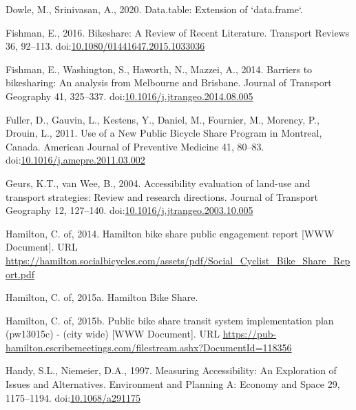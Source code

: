 \documentclass[]{elsarticle} %
\begin{document}
\leavevmode\hypertarget{ref-R-data.table}{}%
Dowle, M., Srinivasan, A., 2020. Data.table: Extension of `data.frame`.

\leavevmode\hypertarget{ref-fishmanBikeshareReviewRecent2016}{}%
Fishman, E., 2016. Bikeshare: A Review of Recent Literature. Transport
Reviews 36, 92--113.
doi:\href{https://doi.org/10.1080/01441647.2015.1033036}{10.1080/01441647.2015.1033036}

\leavevmode\hypertarget{ref-fishmanBarriersBikesharingAnalysis2014}{}%
Fishman, E., Washington, S., Haworth, N., Mazzei, A., 2014. Barriers to
bikesharing: An analysis from Melbourne and Brisbane. Journal of
Transport Geography 41, 325--337.
doi:\href{https://doi.org/10.1016/j.jtrangeo.2014.08.005}{10.1016/j.jtrangeo.2014.08.005}

\leavevmode\hypertarget{ref-fullerUseNewPublic2011}{}%
Fuller, D., Gauvin, L., Kestens, Y., Daniel, M., Fournier, M., Morency,
P., Drouin, L., 2011. Use of a New Public Bicycle Share Program in
Montreal, Canada. American Journal of Preventive Medicine 41, 80--83.
doi:\href{https://doi.org/10.1016/j.amepre.2011.03.002}{10.1016/j.amepre.2011.03.002}

\leavevmode\hypertarget{ref-geursAccessibilityEvaluationLanduse2004}{}%
Geurs, K.T., van Wee, B., 2004. Accessibility evaluation of land-use and
transport strategies: Review and research directions. Journal of
Transport Geography 12, 127--140.
doi:\href{https://doi.org/10.1016/j.jtrangeo.2003.10.005}{10.1016/j.jtrangeo.2003.10.005}

\leavevmode\hypertarget{ref-hamiltonsobi2014}{}%
Hamilton, C. of, 2014. Hamilton bike share public engagement report
{[}WWW Document{]}. URL
\url{https://hamilton.socialbicycles.com/assets/pdf/Social_Cyclist_Bike_Share_Report.pdf}

\leavevmode\hypertarget{ref-hamiltonHamiltonBikeShare2015}{}%
Hamilton, C. of, 2015a. Hamilton Bike Share.

\leavevmode\hypertarget{ref-hamiltonsobi2015}{}%
Hamilton, C. of, 2015b. Public bike share transit system implementation
plan (pw13015c) - (city wide) {[}WWW Document{]}. URL
\url{https://pub-hamilton.escribemeetings.com/filestream.ashx?DocumentId=118356}

\leavevmode\hypertarget{ref-handyMeasuringAccessibilityExploration1997}{}%
Handy, S.L., Niemeier, D.A., 1997. Measuring Accessibility: An
Exploration of Issues and Alternatives. Environment and Planning A:
Economy and Space 29, 1175--1194.
doi:\href{https://doi.org/10.1068/a291175}{10.1068/a291175}
\end{document}
